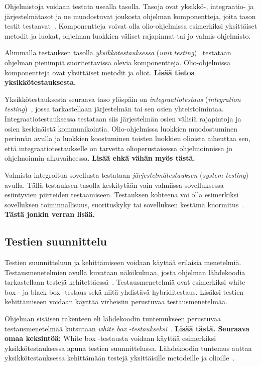 \documentclass[finnish, grading]{tktltiki2}
\theoremstyle{definition}
\theoremstyle{remark}
\begin{document}
Ohjelmistoja voidaan testata usealla tasolla. Tasoja ovat yksikkö-, integraatio- ja järjestelmätasot ja ne muodostuvat joukosta ohjelman komponentteja, joita tason testit testaavat~\cite[s. 45]{Binder:1999}. Komponentteja voivat olla olio-ohjelmissa esimerkiksi yksittäiset metodit ja luokat, ohjelman luokkien väliset rajapinnat tai jo valmis ohjelmisto.

Alimmalla testauksen tasolla \textit{yksikkötestauksessa} (\textit{unit testing})~\cite[s. 45]{Binder:1999} testataan ohjelman pienimpiä suoritettavissa olevia komponentteja. Olio-ohjelmissa komponentteja ovat yksittäiset metodit ja oliot. \textbf{Lisää tietoa yksikkötestauksesta.}

Yksikkötestauksesta seuraava taso ylöspäin on \textit{integraatiotestaus} (\textit{integration testing})~\cite[s. 45]{Binder:1999}, jossa tarkastellaan järjestelmän tai sen osien yhteistoimintaa. Integraatiotestauksessa testataan siis järjestelmän osien välisiä rajapintoja ja osien keskinäistä kommunikointia. Olio-ohjelmissa luokkien muodostuminen perinnän avulla ja luokkien koostuminen toisten luokkien olioista aiheuttaa sen, että integraatiotestaukselle on tarvetta olioperustaisessa ohjelmoinnissa jo ohjelmoinnin alkuvaiheessa. \textbf{Lisää ehkä vähän myös tästä.}

Valmista integroitua sovellusta testataan \textit{järjestelmätestauksen} (\textit{system testing})~\cite[s. 45]{Binder:1999} avulla. Tällä testauksen tasolla keskitytään vain valmiissa sovelluksessa esiintyvien piirteiden testaamiseen. Testauksen kohteena voi olla esimerkiksi sovelluksen toiminnallisuus, suorituskyky tai sovelluksen kestämä kuormitus~\cite[s. 45]{Binder:1999}. \textbf{Tästä jonkin verran lisää.}


\subsection{Testien suunnittelu}

Testien suunnitteluun ja kehittämiseen voidaan käyttää erilaisia menetelmiä. Testausmenetelmien avulla kuvataan näkökulmaa, josta ohjelman lähdekoodia tarkastellaan testejä kehitettäessä~\cite[s. 51]{Binder:1999}. Testausmenetelmiä ovat esimerkiksi white box - ja black box -testaus sekä niitä yhdistävä hybriditestaus. Lisäksi testien kehittämiseen voidaan käyttää virheisiin perustuvaa testausmenetelmää.

Ohjelman sisäisen rakenteen eli lähdekoodin tuntemukseen perustuvaa testausmenetelmää kutsutaan \textit{white box -testaukseksi}~\cite[s. 52]{Binder:1999}. \textbf{Lisää tästä. Seuraava omaa keksintöä:} White box -testausta voidaan käyttää esimerkiksi yksikkötestauksessa apuna testien suunnittelussa. Lähdekoodin tuntemus auttaa yksikkötestauksessa kehittämään testejä yksittäisille metodeille ja olioille~\cite{JOKU??}.
\end{document}
